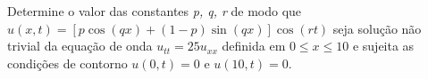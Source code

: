 \linespread{1.5}
Determine o valor das constantes \textit{p, q, r} de modo que $u(x,t) = [p\cos{(qx)} + (1-p)\sin{(qx)}]\cos{(rt)}$ seja solução não trivial da equação de onda $u_{tt} = 25u_{xx}$ definida em $0 \leq x \leq 10$ e sujeita as condições de contorno $u(0,t) = 0$ e $u(10, t) = 0$.